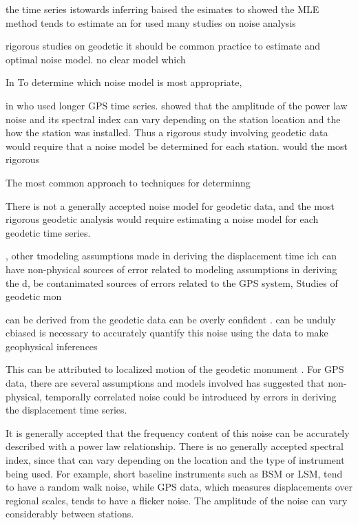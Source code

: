 \documentclass[10pt,a4paper]{article}
\begin{document}
the time series istowards inferring  baised  the esimates to  showed the MLE method tends to estimate an     
 for used many studies on noise analysis    


  rigorous studies on geodetic  it should be common practice to estimate and optimal noise model.  no clear model which 

In To determine which noise model is most appropriate,     

in  who used longer GPS time series.  \citet{Langbein2008} showed that the amplitude of the power law noise and its spectral index can vary depending on the station location and the how the station was installed. Thus a rigorous study involving geodetic data would require that a noise model be determined for each station.  would    the most rigorous      

The most common approach to techniques for determinng  


There is not a generally accepted noise model for geodetic data, and the most rigorous geodetic analysis would require estimating a noise model for each geodetic time series.  

    ,  other tmodeling assumptions made in deriving the displacement time ich can have non-physical sources of error related to modeling assumptions in deriving the d,  be contanimated sources of errors  related to the GPS system,            Studies of geodetic mon  


can be derived from the geodetic data can be overly confident \citep[e.g][]{Mao1999}.  can be unduly cbiased  is necessary to accurately quantify this noise using the data to make geophysical inferences 


This can be attributed to localized motion of the geodetic monument \citep[e.g.][]{Wyatt1982,Wyatt1989,Agnew1992,King2009}. For GPS data, there are several assumptions and models involved  \citet{Langbeing2008,Langbein2012} has suggested that non-physical, temporally correlated noise could be introduced by errors in deriving the displacement time series.  

It is generally accepted that the frequency content of this noise can be accurately described with a power law relationship.  There is no generally accepted spectral index, since that can vary depending on the location and the type of instrument being used.  For example, short baseline instruments such as BSM or LSM, tend to have a random walk noise, while GPS data, which measures displacements over regional scales, tends to have a flicker noise.  The amplitude of the noise can vary considerably between stations. 
\end{document}
